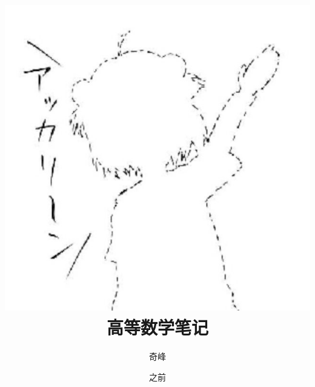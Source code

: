 \documentclass[oneside]{ctexbook}
\title{\includegraphics[scale=0.6]{1.jpg}\\ \textsf{高等数学笔记}}
\author{奇峰}
\date{之前}
\begin{document}
\theoremseparator{}
\newtheorem{def1}{定义}[section]
\newtheorem{theo1}{定理}[section]
\newtheorem{func1}{方法}[section]
\newtheorem{infer1}{推论}[section]
\newenvironment{proof}{\begin{itemize}\item \textbf{证明}
	
	}{\end{itemize}}


\newenvironment{Def}[1][\quad{}]{\begin{def1}\textbf{#1}}{\end{def1}}
\newenvironment{Theo}[1][\quad{}]{\begin{theo1}\textbf{#1}}{\end{theo1}}
\newenvironment{Func}[1][\quad{}]{\begin{func1}\textbf{#1}}{\end{func1}}
\newenvironment{Infer}[1][\quad{}]{\begin{infer1}\textbf{#1}}{\end{infer1}}
\newenvironment{Field}[1][\quad{}]{\noindent\newline\textbf{#1}}{}

\setlength{\parskip}{3pt}

\newcommand{\from}[1]{\hypertarget{#1}{}}
\newcommand{\goto}[1]{\quad{}\hyperlink{#1}{$ \diamondsuit $ }\hypertarget{K#1}{}}

\newcommand{\getback}[1]{\quad{}\hyperlink{K#1}{$ \blacksquare $ }}
\newcommand{\qline}{\underline{~~~~~~~~}}

\frontmatter
\maketitle
\hypertarget{Index}{}
\tableofcontents

\mainmatter








\end{document}
